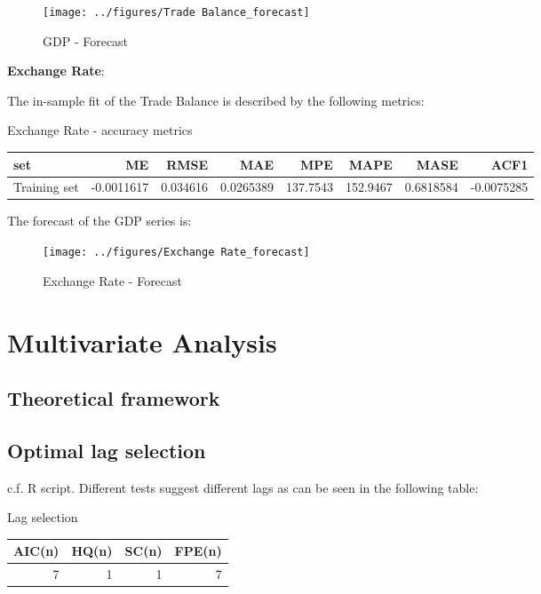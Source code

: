 \documentclass[
]{article}
\begin{document}
\begin{figure}

{\centering \texttt{[image: ../figures/Trade Balance\_forecast]} 

}

\caption{GDP - Forecast}\label{fig:unnamed-chunk-18}
\end{figure}

\textbf{Exchange Rate}:

The in-sample fit of the Trade Balance is described by the following
metrics:

\bgroup \table[H]
\centering
\caption{\label{tab:unnamed-chunk-19}Exchange Rate - accuracy metrics}
\centering
\begin{tabular}[t]{lrrrrrrr}
\toprule
set & ME & RMSE & MAE & MPE & MAPE & MASE & ACF1\\
\midrule
Training set & -0.0011617 & 0.034616 & 0.0265389 & 137.7543 & 152.9467 & 0.6818584 & -0.0075285\\
\bottomrule
\end{tabular}
\endtable\egroup

The forecast of the GDP series is:

\begin{figure}

{\centering \texttt{[image: ../figures/Exchange Rate\_forecast]} 

}

\caption{Exchange Rate - Forecast}\label{fig:unnamed-chunk-20}
\end{figure}

\section{Multivariate Analysis}

\subsection{Theoretical framework}

\subsection{Optimal lag selection}

c.f. R script. Different tests suggest different lags as can be seen in
the following table:

\bgroup \table[H]
\centering
\caption{\label{tab:unnamed-chunk-21}Lag selection}
\centering
\begin{tabular}[t]{rrrr}
\toprule
AIC(n) & HQ(n) & SC(n) & FPE(n)\\
\midrule
7 & 1 & 1 & 7\\
\bottomrule
\end{tabular}
\endtable\egroup
\end{document}
